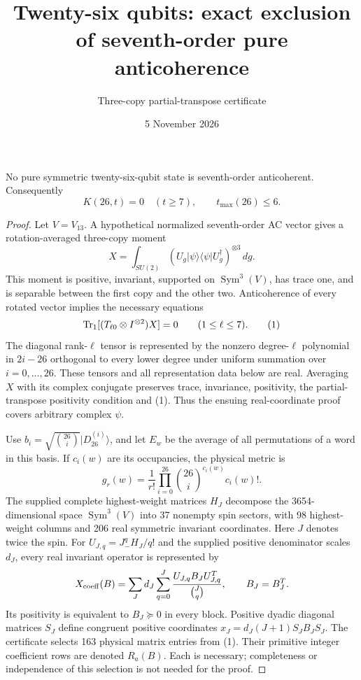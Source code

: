\documentclass[11pt]{article}
\begin{document}
\title{Twenty-six qubits: exact exclusion of seventh-order pure anticoherence}
\author{Three-copy partial-transpose certificate}\date{5 November 2026}\maketitle
\begin{theorem}
No pure symmetric twenty-six-qubit state is seventh-order anticoherent. Consequently
\[
\boxed{K(26,t)=0\quad(t\ge7),\qquad t_{\max}(26)\le6.}
\]
\end{theorem}
\begin{proof}
Let $V=V_{13}$. A hypothetical normalized seventh-order AC vector gives a rotation-averaged three-copy moment
\[
 X=\int_{SU(2)}(U_g|\psi\rangle\langle\psi|U_g^\dagger)^{\otimes3}\,dg.
\]
This moment is positive, invariant, supported on $\operatorname{Sym}^3(V)$, has trace one, and is separable between the first copy and the other two. Anticoherence of every rotated vector implies the necessary equations
\[
 \operatorname{Tr}_1[(T_{\ell0}\otimes I^{\otimes2})X]=0\qquad(1\le\ell\le7). \tag{1}
\]
The diagonal rank-$\ell$ tensor is represented by the nonzero degree-$\ell$ polynomial in $2i-26$ orthogonal to every lower degree under uniform summation over $i=0,\ldots,26$. These tensors and all representation data below are real. Averaging $X$ with its complex conjugate preserves trace, invariance, positivity, the partial-transpose positivity condition and (1). Thus the ensuing real-coordinate proof covers arbitrary complex $\psi$.

Use $b_i=\sqrt{\binom{26}{i}}|D_{26}^{(i)}\rangle$, and let $E_w$ be the average of all permutations of a word in this basis. If $c_i(w)$ are its occupancies, the physical metric is
\[
 g_r(w)=\frac1{r!}\prod_{i=0}^{26}\binom{26}{i}^{c_i(w)}c_i(w)!.
\]
The supplied complete highest-weight matrices $H_J$ decompose the 3654-dimensional space $\operatorname{Sym}^3(V)$ into 37 nonempty spin sectors, with 98 highest-weight columns and 206 real symmetric invariant coordinates. Here $J$ denotes twice the spin. For $U_{J,q}=J_-^qH_J/q!$ and the supplied positive denominator scales $d_J$, every real invariant operator is represented by
\[
 X_{\rm coeff}(B)=\sum_Jd_J\sum_{q=0}^{J}\frac{U_{J,q}B_JU_{J,q}^T}{\binom Jq},\qquad B_J=B_J^T.
\]
Its positivity is equivalent to $B_J\succeq0$ in every block. Positive dyadic diagonal matrices $S_J$ define congruent positive coordinates $x_J=d_J(J+1)S_JB_JS_J$.
The certificate selects 163 physical matrix entries from (1). Their primitive integer coefficient rows are denoted $R_a(B)$. Each is necessary; completeness or independence of this selection is not needed for the proof.


\end{proof}
\end{document}
